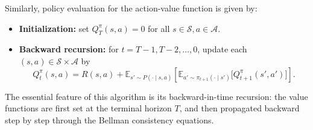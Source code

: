 \documentclass[
]{book}
\providecommand{\tightlist}{%
  \setlength{\itemsep}{0pt}\setlength{\parskip}{0pt}}
\theoremstyle{definition}
\theoremstyle{definition}
\theoremstyle{definition}
\theoremstyle{definition}
\theoremstyle{remark}
\begin{document}
Similarly, policy evaluation for the action-value function is given by:

\begin{itemize}
\tightlist
\item
  \textbf{Initialization:} set \(Q^{\pi}_T(s,a) = 0\) for all \(s \in \mathcal{S}, a \in \mathcal{A}\).\\
\item
  \textbf{Backward recursion:} for \(t = T-1, T-2, \dots, 0\), update each \((s,a) \in \mathcal{S}\times\mathcal{A}\) by
  \[
  Q^{\pi}_t(s,a) = R(s, a) + \mathbb{E}_{s' \sim P(\cdot \mid s, a)} \left[ \mathbb{E}_{a' \sim \pi_{t+1}(\cdot \mid s')} \big[ Q^{\pi}_{t+1}(s', a') \big] \right].
  \]
\end{itemize}

The essential feature of this algorithm is its backward-in-time recursion: the value functions are first set at the terminal horizon \(T\), and then propagated backward step by step through the Bellman consistency equations.
\end{document}
